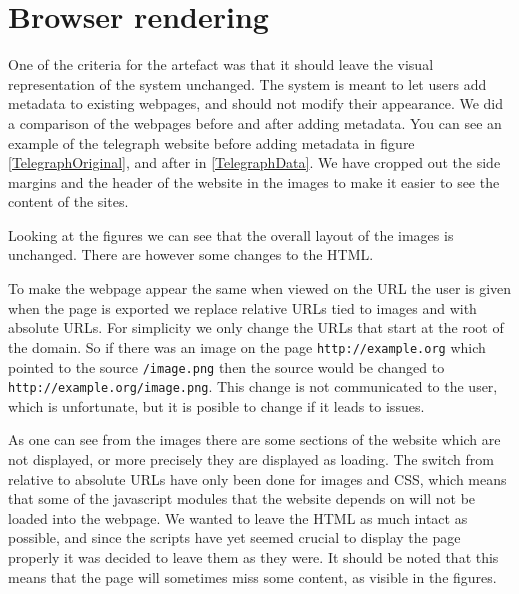 \section{Browser rendering}
\label{Rendering}
One of the criteria for the artefact was that it should leave the visual representation of the system unchanged.
The system is meant to let users add metadata to existing webpages, and should not modify their appearance.
We did a comparison of the webpages before and after adding metadata.
You can see an example of the telegraph website before adding metadata in figure \ref{TelegraphOriginal},
and after in \ref{TelegraphData}.
We have cropped out the side margins and the header of the website in the images to make it easier to see the content of the sites.


Looking at the figures we can see that the overall layout of the images is unchanged.
There are however some changes to the HTML.

To make the webpage appear the same when viewed on the URL the user is given when the page is exported
we replace relative URLs tied to images and  with absolute URLs.
For simplicity we only change the URLs that start at the root of the domain.
So if there was an image on the page \texttt{http://example.org} which pointed to the source \texttt{/image.png}
then the source would be changed to \texttt{http://example.org/image.png}.
This change is not communicated to the user, which is unfortunate,
but it is posible to change if it leads to issues.

As one can see from the images there are some sections of the website which are not displayed, or more precisely they
are displayed as loading.
The switch from relative to absolute URLs have only been done for images and CSS,
which means that some of the javascript modules that the website depends on will not be loaded into the webpage.
We wanted to leave the HTML as much intact as possible,
and since the scripts have yet seemed crucial to display the page properly it was decided to leave them as they were.
It should be noted that this means that the page will sometimes miss some content, as visible in the figures.

